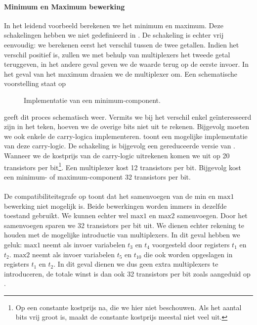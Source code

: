 \paragraph{Minimum en Maximum bewerking}
In het leidend voorbeeld berekenen we het minimum en maximum. Deze schakelingen hebben we niet gedefinieerd in . De schakeling is echter vrij eenvoudig: we berekenen eerst het verschil tussen de twee getallen. Indien het verschil positief is, zullen we met behulp van multiplexers het tweede getal teruggeven, in het andere geval geven we de waarde terug op de eerste invoer. In het geval van het maximum draaien we de multiplexer om. Een schematische voorstelling staat op 
\begin{figure}[hbt]
\centering
{}
\caption{Implementatie van een minimum-component.}
\end{figure}
geeft dit proces schematisch weer. Vermits we bij het verschil enkel ge\"interesseerd zijn in het teken, hoeven we de overige bits niet uit te rekenen. Bijgevolg moeten we ook enkele de carry-logica implementeren.  toont een mogelijke implementatie van deze carry-logic. De schakeling is bijgevolg een gereduceerde versie van . Wanneer we de kostprijs van de carry-logic uitrekenen komen we uit op 20 transistors per bit\footnote{Op een constante kostprijs na, die we hier niet beschouwen. Als het aantal bits vrij groot is, maakt de constante kostprijs meestal niet veel uit.}. Een multiplexer kost 12 transistors per bit. Bijgevolg kost een minimum- of maximum-component 32 transistors per bit.
\paragraph{}
De compatibiliteitsgrafe op  toont dat het samenvoegen van de $\mbox{min}$ en $\mbox{max1}$ bewerking niet mogelijk is. Beide bewerkingen worden immers in dezelfde toestand gebruikt. We kunnen echter wel $\mbox{max1}$ en $\mbox{max2}$ samenvoegen. Door het samenvoegen sparen we 32 transistors per bit uit. We dienen echter rekening te houden met de mogelijke introductie van multiplexers. In dit geval hebben we geluk: $\mbox{max1}$ neemt als invoer variabelen $t_3$ en $t_4$ voorgesteld door registers $t_1$ en $t_2$. $\mbox{max2}$ neemt als invoer variabelen $t_5$ en $t_{10}$ die ook worden opgeslagen in registers $t_1$ en $t_2$. In dit geval dienen we dus geen extra multiplexers te introduceren, de totale winst is dan ook 32 transistors per bit zoals aangeduid op .
